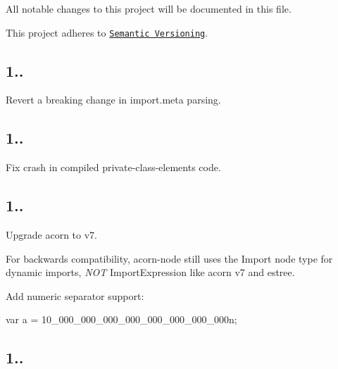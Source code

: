 All notable changes to this project will be documented in this file.

This project adheres to \href{http://semver.org/}{\tt Semantic Versioning}.

\subsection*{1..}


\begin{DoxyItemize}
\item Revert a breaking change in import.\+meta parsing.
\end{DoxyItemize}

\subsection*{1..}


\begin{DoxyItemize}
\item Fix crash in compiled private-\/class-\/elements code.
\end{DoxyItemize}

\subsection*{1..}


\begin{DoxyItemize}
\item Upgrade acorn to v7.

For backwards compatibility, {\ttfamily acorn-\/node} still uses the {\ttfamily Import} node type for dynamic imports, {\itshape N\+OT} {\ttfamily Import\+Expression} like acorn v7 and estree.
\item Add numeric separator support\+: 
\begin{DoxyCode}
var a = 10\_000\_000\_000\_000\_000\_000\_000\_000n;
\end{DoxyCode}

\end{DoxyItemize}

\subsection*{1..}


